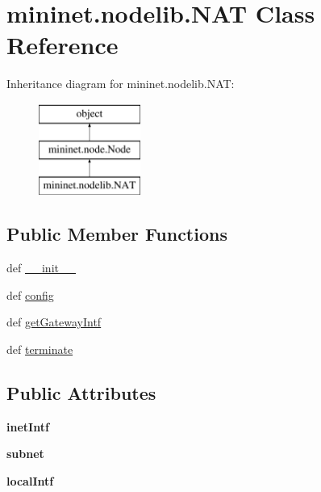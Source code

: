 \hypertarget{classmininet_1_1nodelib_1_1NAT}{\section{mininet.\-nodelib.\-N\-A\-T Class Reference}
\label{classmininet_1_1nodelib_1_1NAT}
}
Inheritance diagram for mininet.\-nodelib.\-N\-A\-T\-:\begin{figure}[H]
\begin{center}
\leavevmode
\includegraphics[height=3.000000cm]{classmininet_1_1nodelib_1_1NAT}
\end{center}
\end{figure}
\subsection*{Public Member Functions}
\begin{DoxyCompactItemize}
\item 
def \hyperlink{classmininet_1_1nodelib_1_1NAT_a54c64c441f6253d5052cf861eada67c7}{\-\_\-\-\_\-init\-\_\-\-\_\-}
\item 
def \hyperlink{classmininet_1_1nodelib_1_1NAT_a41b8cdfa25ae1333e98de36c9915075c}{config}
\item 
def \hyperlink{classmininet_1_1nodelib_1_1NAT_a13f8384350ff0d73902a5ed5c520a753}{get\-Gateway\-Intf}
\item 
def \hyperlink{classmininet_1_1nodelib_1_1NAT_ad5c247f368c06be11a87cc2ea8e5db82}{terminate}
\end{DoxyCompactItemize}
\subsection*{Public Attributes}
\begin{DoxyCompactItemize}
\item 
\hypertarget{classmininet_1_1nodelib_1_1NAT_af76b2d3545f5f0a3ede7534ba6a2d375}{{\bfseries inet\-Intf}}\label{classmininet_1_1nodelib_1_1NAT_af76b2d3545f5f0a3ede7534ba6a2d375}

\item 
\hypertarget{classmininet_1_1nodelib_1_1NAT_a66367861e1d6099e8ffabb2bcae0dda7}{{\bfseries subnet}}\label{classmininet_1_1nodelib_1_1NAT_a66367861e1d6099e8ffabb2bcae0dda7}

\item 
\hypertarget{classmininet_1_1nodelib_1_1NAT_a648889495d4ab3f64240cda2b1a8002d}{{\bfseries local\-Intf}}\label{classmininet_1_1nodelib_1_1NAT_a648889495d4ab3f64240cda2b1a8002d}

\end{DoxyCompactItemize}
